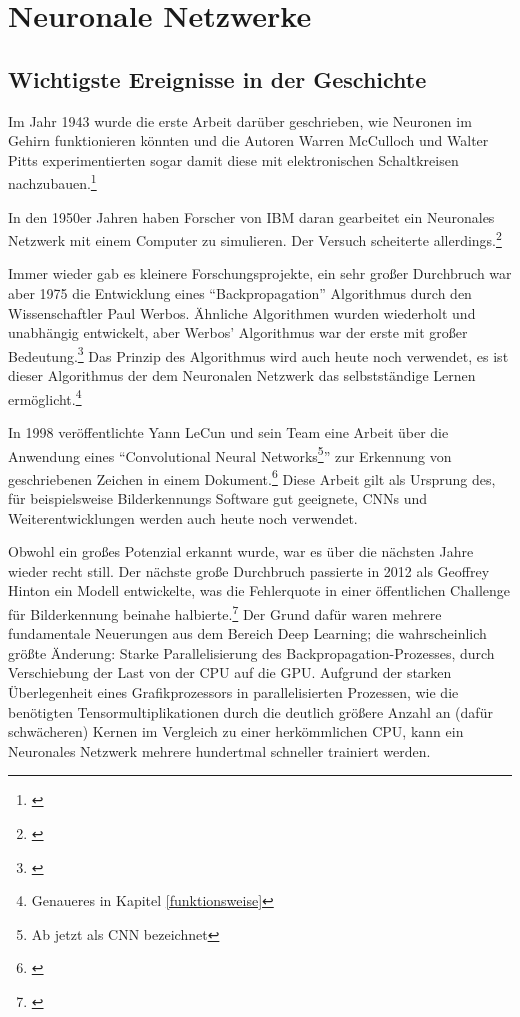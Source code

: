 \section{Neuronale Netzwerke}

\subsection{Wichtigste Ereignisse in der Geschichte}

Im Jahr 1943 wurde die erste Arbeit darüber geschrieben, wie Neuronen im Gehirn funktionieren könnten und die Autoren Warren McCulloch und Walter Pitts experimentierten sogar damit diese mit elektronischen Schaltkreisen nachzubauen.\footnote{\cite[]{alogicalcalculus}}

In den 1950er Jahren haben Forscher von IBM daran gearbeitet ein Neuronales Netzwerk mit einem Computer zu simulieren. Der Versuch scheiterte allerdings.\footnote{\cite[Absatz 3]{nnhistory}}

Immer wieder gab es kleinere Forschungsprojekte, ein sehr großer Durchbruch war aber 1975 die Entwicklung eines "`Backpropagation"' Algorithmus durch den Wissenschaftler Paul Werbos. Ähnliche Algorithmen wurden wiederholt und unabhängig entwickelt, aber Werbos' Algorithmus war der erste mit großer Bedeutung.\footnote{\cite[]{paulwerbosbackpropagation}} Das Prinzip des Algorithmus wird auch heute noch verwendet, es ist dieser Algorithmus der dem Neuronalen Netzwerk das selbstständige Lernen ermöglicht.\footnote{Genaueres in Kapitel \ref{funktionsweise}}

In 1998 veröffentlichte Yann LeCun und sein Team eine Arbeit über die Anwendung eines "`Convolutional Neural Networks\footnote{Ab jetzt als CNN bezeichnet}"' zur Erkennung von geschriebenen Zeichen in einem Dokument.\footnote{\cite[]{cnnhistory}} Diese Arbeit gilt als Ursprung des, für beispielsweise Bilderkennungs Software gut geeignete, CNNs und Weiterentwicklungen werden auch heute noch verwendet.

Obwohl ein großes Potenzial erkannt wurde, war es über die nächsten Jahre wieder recht still. Der nächste große Durchbruch passierte in 2012 als Geoffrey Hinton ein Modell entwickelte, was die Fehlerquote in einer öffentlichen Challenge für Bilderkennung beinahe halbierte.\footnote{\cite[]{geoffrey}} Der Grund dafür waren mehrere fundamentale Neuerungen aus dem Bereich Deep Learning; die wahrscheinlich größte Änderung: Starke Parallelisierung des Backpropagation-Prozesses, durch Verschiebung der Last von der CPU auf die GPU. Aufgrund der starken Überlegenheit eines Grafikprozessors in parallelisierten Prozessen, wie die benötigten Tensormultiplikationen durch die deutlich größere Anzahl an (dafür schwächeren) Kernen im Vergleich zu einer herkömmlichen CPU, kann ein Neuronales Netzwerk mehrere hundertmal schneller trainiert werden.

